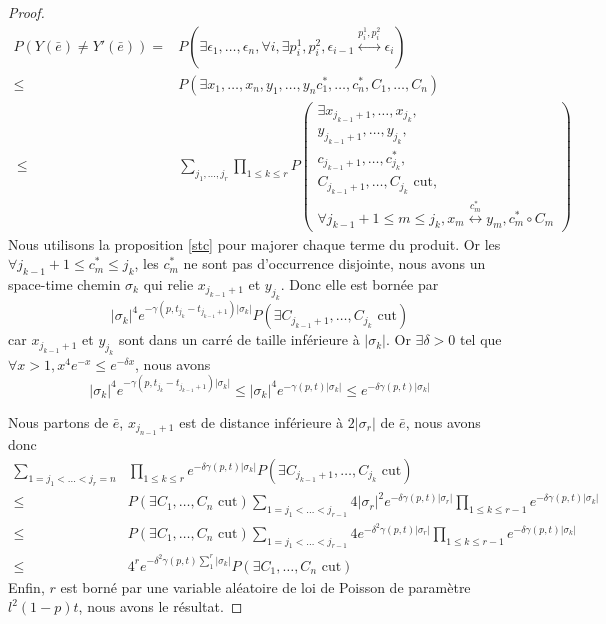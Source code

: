 \documentclass[titlepage,a4paper,12pt]{article}
\newcounter{prop}
\newcommand{\connect}{\leftrightarrow}
\begin{document}
\begin{proof}
\begin{align*}
P(Y(\bar{e})\neq Y'(\bar{e})) =& P(\exists \epsilon_1,\dots,\epsilon_n, \forall i, \exists p_i^1,p_i^2, \epsilon_{i-1}\overset{p_i^1,p_i^2}{\connect}\epsilon_i) \\
 \leqslant &P(\exists x_1,\dots,x_n,y_1,\dots,y_n c^*_1,\dots,c^*_n,C_1,\dots,C_n) \\\
 \leqslant &\sum_{j_1,\dots,j_r}\prod_{1\leqslant k \leqslant r} P\left(\begin{array}{c}
 \exists x_{j_{k-1}+1},\dots,x_{j_k},\\
 y_{j_{k-1}+1},\dots,y_{j_k},\\
 c_{j_{k-1}+1},\dots,c^*_{j_k},\\
 C_{j_{k-1}+1},\dots,C_{j_k} \text{ cut},\\
 \forall j_{k-1}+1 \leqslant m \leqslant j_k, x_m\overset{c^*_m}{\connect} y_m, 
 c^*_m\circ C_m
 \end{array}
 \right)
\end{align*}
Nous utilisons la proposition \ref{stc} pour majorer chaque terme du produit. Or les $\forall j_{k-1}+1 \leqslant c^*_m \leqslant j_k$, les $c^*_m$ ne sont pas d'occurrence disjointe, nous avons un space-time chemin $\sigma_k$ qui relie $x_{j_{k-1}+1}$ et $y_{j_k}$. Donc elle est bornée par $$ \displaystyle |\sigma_k|^4 e^{-\gamma(p,t_{j_k}-t_{j_{k-1}+1})|\sigma_k|} P(\exists C_{j_{k-1}+1},\dots,C_{j_k} \text{ cut})$$ car $x_{j_{k-1}+1}$ et $y_{j_k}$ sont dans un carré de taille inférieure à $ |\sigma_k|$. Or $\exists \delta>0$ tel que $\forall x>1, x^4e^{-x} \leqslant e^{-\delta x}$, nous avons 
$$|\sigma_k|^4 e^{-\gamma(p,t_{j_k}-t_{j_{k-1}+1})|\sigma_k|} \leqslant |\sigma_k|^4 e^{-\gamma(p,t)|\sigma_k|} \leqslant e^{-\delta\gamma(p,t)|\sigma_k|}$$

Nous partons de $\bar{e}$, $x_{j_{n-1}+1}$ est de distance inférieure à $2|\sigma_r|$ de $\bar{e}$, nous avons donc 
\begin{align*}\sum_{1=j_1<\dots < j_r = n} &\prod_{1\leqslant k \leqslant r} e^{-\delta \gamma(p,t)|\sigma_k|} P(\exists C_{j_{k-1}+1},\dots,C_{j_k} \text{ cut}) \\
\leqslant & P(\exists C_1,\dots,C_n \text{ cut})\sum_{1=j_1<\dots < j_{r-1}} 4|\sigma_r|^2e^{-\delta \gamma(p,t)|\sigma_r|}\prod_{1\leqslant k \leqslant r-1}e^{-\delta \gamma(p,t)|\sigma_k|} \\
\leqslant & P(\exists C_1,\dots,C_n \text{ cut})\sum_{1=j_1<\dots < j_{r-1}} 4e^{-\delta^2 \gamma(p,t)|\sigma_r|}\prod_{1\leqslant k \leqslant r-1}e^{-\delta \gamma(p,t)|\sigma_k|} \\
\leqslant & 4^r e^{-\delta^2 \gamma(p,t)\sum_1^r|\sigma_k|}P(\exists C_1,\dots,C_n \text{ cut})
\end{align*}
Enfin, $r$ est borné par une variable aléatoire de loi de Poisson de paramètre $l^2 (1-p) t$, nous avons le résultat.
\end{proof}
\end{document}
